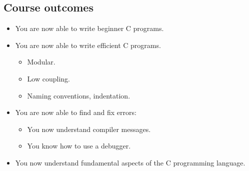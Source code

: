 \subsection{Course outcomes}
\begin{itemize}
    \item You are now able to write beginner C programs.
    \item You are now able to write efficient C programs. 
        \begin{itemize}
            \item Modular.
            \item Low coupling.
            \item Naming conventions, indentation.
        \end{itemize}
    
    \item You are now able to find and fix errors:
        \begin{itemize}
            \item You now understand compiler messages. 
            \item You know how to use a debugger. 
        \end{itemize}
    
    \item You now understand fundamental aspects of the C programming language.
\end{itemize}
